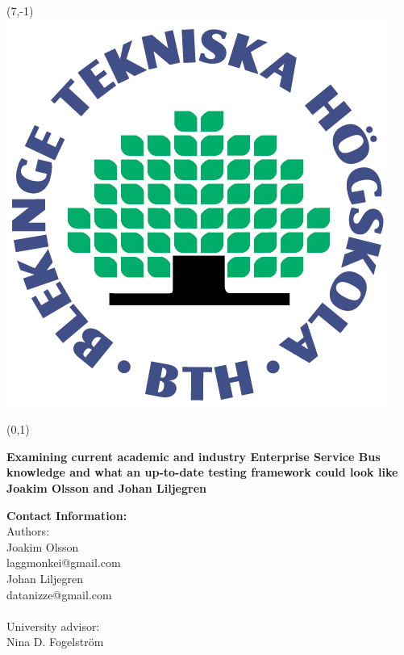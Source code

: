 \pagestyle{fancy}
\cfoot{}
\renewcommand{\headrulewidth}{0pt}
\renewcommand{\footrulewidth}{0pt}

\begin{textblock}{5}(7,-1)
	\includegraphics{img/bth_logo.png}
\end{textblock}

\begin{textblock}{9}(0,1)
\vspace*{2cm}
\begin{center} 
	{\bf\fontsize{24}{30}\selectfont Examining current academic and industry Enterprise Service Bus knowledge and what an up-to-date testing framework could look like} \\[3cm]
	{\bf\fontsize{16}{20}\selectfont Joakim Olsson and Johan Liljegren} \\[2cm]
\end{center}

{\noindent\bf Contact Information:} \\
Authors: \\
Joakim Olsson \\
laggmonkei@gmail.com \\
Johan Liljegren \\
datanizze@gmail.com \\ \\

\noindent University advisor: \\
Nina D. Fogelström
\end{textblock}
